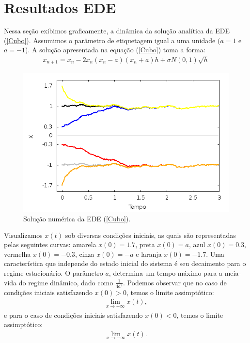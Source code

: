 \section{Resultados EDE}
Nessa seção exibimos graficamente, a dinâmica da solução analítica da EDE (\ref{Cubo}). Assumimos o parâmetro de etiquetagem igual a uma unidade ($a = 1 $ e $ a = -1$). A solução apresentada na equação (\ref{Cubo}) toma a forma:
\begin{eqnarray}\label{eq11111222}
x_{n+1} = x_{n} - 2x_{n}(x_{n} - a)(x_{n} + a)h + \sigma N(0,1) \sqrt{h}
\end{eqnarray}
\begin{figure}[!htb]
\centering
\begin{minipage}[b]{0.9\linewidth}
\includegraphics[width=\linewidth]{./img/analiseAssimptoticaEM.png}
\caption{Solução numérica da EDE (\ref{Cubo}).}
\label{fig0000}
\end{minipage} \hfill
\end{figure}
Visualizamos $x(t)$ sob diversas condições iniciais, as quais são representadas pelas seguintes curvas: amarela $x(0) = 1.7$, preta $x(0) = a$, azul $x(0) = 0.3$, vermelha $x(0) = -0.3$, cinza $x(0) = -a$ e laranja $x(0) = -1.7$. Uma característica que independe do estado inicial do sistema é seu decaimento para o regime estacionário. O parâmetro $a$, determina um tempo máximo para a meia-vida do regime dinâmico, dado como $\frac{1}{4a^{2}}$. Podemos observar que no caso de condições iniciais satisfazendo $x(0) > 0$, temos o limite assimptótico:
\begin{eqnarray}
\lim_{x \rightarrow +\infty} x(t) ,
\end{eqnarray}
e para o caso de condições iniciais satisfazendo $x(0) < 0$, temos o limite assimptótico:
\begin{eqnarray}
\lim_{x \rightarrow -\infty} x(t).
\end{eqnarray}

